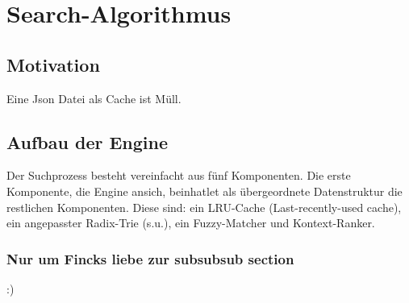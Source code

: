 \section{Search-Algorithmus}
\subsection{Motivation}
Eine Json Datei als Cache ist Müll.

\subsection{Aufbau der Engine}
Der Suchprozess besteht vereinfacht aus fünf Komponenten. Die erste Komponente, die Engine ansich, beinhatlet als übergeordnete Datenstruktur die restlichen Komponenten. Diese sind: ein LRU-Cache (Last-recently-used cache), ein angepasster Radix-Trie (s.u.), ein Fuzzy-Matcher und Kontext-Ranker.
\subsubsection{Nur um Fincks liebe zur subsubsub section}
:)
